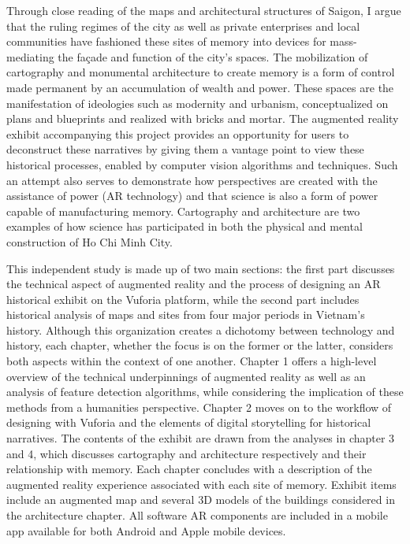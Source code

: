 Through close reading of the maps and architectural structures of Saigon, I argue that the ruling regimes of the city as well as private enterprises and local communities have fashioned these sites of memory into devices for mass-mediating the façade and function of the city’s spaces. The mobilization of cartography and monumental architecture to create memory is a form of control made permanent by an accumulation of wealth and power. These spaces are the manifestation of ideologies such as modernity and urbanism, conceptualized on plans and blueprints and realized with bricks and mortar. The augmented reality exhibit accompanying this project provides an opportunity for users to deconstruct these narratives by giving them a vantage point to view these historical processes, enabled by computer vision algorithms and techniques. Such an attempt also serves to demonstrate how perspectives are created with the assistance of power (AR technology) and that science is also a form of power capable of manufacturing memory. Cartography and architecture are two examples of how science has participated in both the physical and mental construction of Ho Chi Minh City.

This independent study is made up of two main sections: the first part discusses the technical aspect of augmented reality and the process of designing an AR historical exhibit on the Vuforia platform, while the second part includes historical analysis of maps and sites from four major periods in Vietnam’s history. Although this organization creates a dichotomy between technology and history, each chapter, whether the focus is on the former or the latter, considers both aspects within the context of one another. Chapter 1 offers a high-level overview of the technical underpinnings of augmented reality as well as an analysis of feature detection algorithms, while considering the implication of these methods from a humanities perspective. Chapter 2 moves on to the workflow of designing with Vuforia and the elements of digital storytelling for historical narratives. The contents of the exhibit are drawn from the analyses in chapter 3 and 4, which discusses cartography and architecture respectively and their relationship with memory. Each chapter concludes with a description of the augmented reality experience associated with each site of memory. Exhibit items include an augmented map and several 3D models of the buildings considered in the architecture chapter. All software AR components are included in a mobile app available for both Android and Apple mobile devices.

\en
